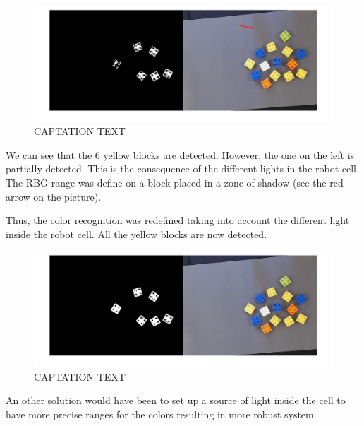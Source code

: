 \begin{figure}[hb]
  \centering
  \includegraphics[scale=0.3]{figures/Thres_Y_bad2.png}
  \caption[LABEL] {CAPTATION TEXT}
\end{figure}
  
\begin{flushleft}
We can see that the 6 yellow blocks are detected. However, the one on the left is partially detected. This is the consequence of the different lights in the robot cell. The RBG range was define on a block placed in a zone of shadow (see the red arrow on the picture).
\end{flushleft}  
\par

\begin{flushleft}
Thus, the color recognition was redefined taking into account the different light inside the robot cell. All the yellow blocks are now detected.
\end{flushleft}


\begin{figure}[hb]
  \centering
  \includegraphics[scale=0.3]{figures/Thres_Y_good.png}
  \caption[LABEL] {CAPTATION TEXT}
\end{figure}

\begin{flushleft}
An other solution would have been to set up a source of light inside the cell to have more precise ranges for the colors resulting in more robust system.
\end{flushleft}



